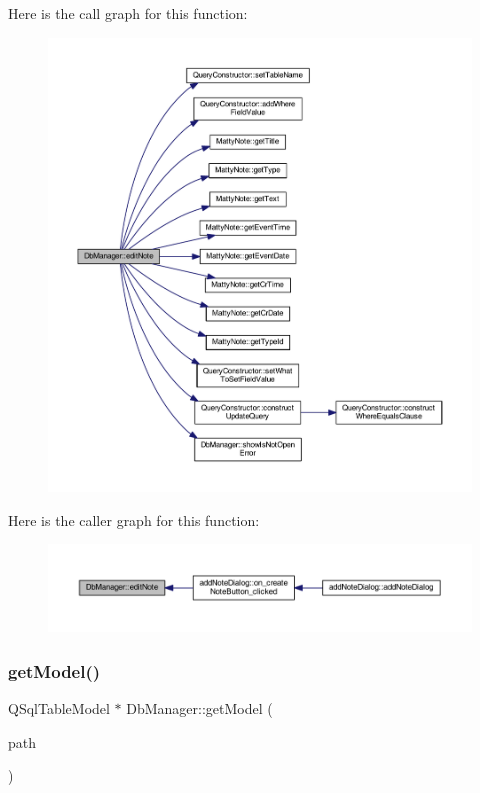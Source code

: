 Here is the call graph for this function\+:
\nopagebreak
\begin{figure}[H]
\begin{center}
\leavevmode
\includegraphics[width=350pt]{classDbManager_af27c0367d70db496305ec5cab6324fe9_cgraph}
\end{center}
\end{figure}
Here is the caller graph for this function\+:
\nopagebreak
\begin{figure}[H]
\begin{center}
\leavevmode
\includegraphics[width=350pt]{classDbManager_af27c0367d70db496305ec5cab6324fe9_icgraph}
\end{center}
\end{figure}
\hypertarget{classDbManager_ac4e759380194e624382e267432de5357}{}\label{classDbManager_ac4e759380194e624382e267432de5357} 
\subsubsection{\texorpdfstring{get\+Model()}{getModel()}}
{\footnotesize\ttfamily Q\+Sql\+Table\+Model $\ast$ Db\+Manager\+::get\+Model (\begin{DoxyParamCaption}\item[{const Q\+String \&}]{path }\end{DoxyParamCaption})\hspace{0.3cm}{\ttfamily [static]}}



